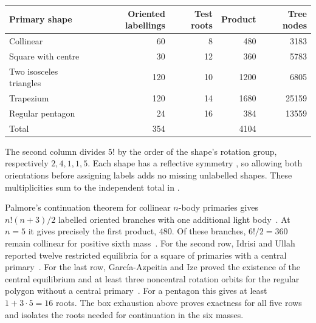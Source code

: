 \documentclass[11pt]{article}
\begin{document}
\begin{center}
\begin{tabular}{lrrrr}
Primary shape & Oriented labellings & Test roots & Product & Tree nodes\\
\hline
Collinear & 60 & 8 & 480 & 3183\\
Square with centre & 30 & 12 & 360 & 5783\\
Two isosceles triangles & 120 & 10 & 1200 & 6805\\
Trapezium & 120 & 14 & 1680 & 25159\\
Regular pentagon & 24 & 16 & 384 & 13559\\
\hline
Total & 354 & & 4104 & \\
\end{tabular}
\end{center}
The second column divides $5!$ by the order of the shape's rotation group, respectively $2,4,1,1,5$. Each shape has a reflective symmetry \cite{equal}, so allowing both orientations before assigning labels adds no missing unlabelled shapes. These multiplicities sum to the independent total in \cite[Table 3]{near}.

Palmore's continuation theorem for collinear $n$-body primaries gives $n!(n+3)/2$ labelled oriented branches with one additional light body~\cite{palmore}. At $n=5$ it gives precisely the first product, $480$. Of these branches, $6!/2=360$ remain collinear for positive sixth mass~\cite{moulton}. For the second row, Idrisi and Ullah reported twelve restricted equilibria for a square of primaries with a central primary~\cite{square}. For the last row, Garc\'ia-Azpeitia and Ize proved the existence of the central equilibrium and at least three noncentral rotation orbits for the regular polygon without a central primary~\cite[Props.~14 and 17(b)]{restrictedpolygon}. For a pentagon this gives at least $1+3\cdot5=16$ roots. The box exhaustion above proves exactness for all five rows and isolates the roots needed for continuation in the six masses.
\end{document}
